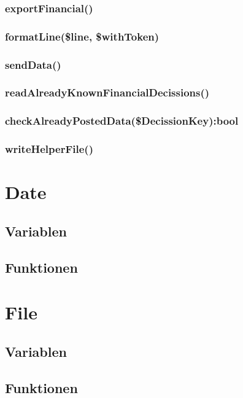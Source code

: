 \documentclass[12pt,parskip=full, pagea4]{scrreprt}
\begin{document}
	\subsubsection{exportFinancial()}
	
	\subsubsection{formatLine(\$line, \$withToken)}
	
	\subsubsection{sendData()}
	
	\subsubsection{readAlreadyKnownFinancialDecissions()}
	
	\subsubsection{checkAlreadyPostedData(\$DecissionKey):bool}
	
	\subsubsection{writeHelperFile()}
	
	\section{Date}
	\subsection{Variablen}
	\subsection{Funktionen}
	
	\section{File}
	\subsection{Variablen}
	\subsection{Funktionen}
	
\end{document}
